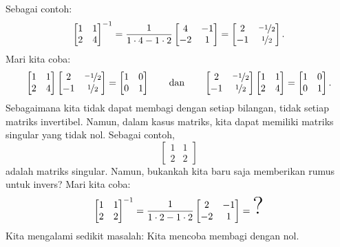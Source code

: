 Sebagai contoh:
\begin{equation*}
\begin{bmatrix}
1 & 1 \\
2 & 4
\end{bmatrix}^{-1}
=
\frac{1}{1\cdot 4-1 \cdot 2}
\begin{bmatrix}
4 & -1 \\
-2 & 1
\end{bmatrix}
=
\begin{bmatrix}
2 & \nicefrac{-1}{2} \\
-1 & \nicefrac{1}{2}
\end{bmatrix} .
\end{equation*}
Mari kita coba:
\begin{equation*}
\begin{bmatrix}
1 & 1 \\
2 & 4
\end{bmatrix}
\begin{bmatrix}
2 & \nicefrac{-1}{2} \\
-1 & \nicefrac{1}{2}
\end{bmatrix}
=
\begin{bmatrix}
1 & 0 \\
0 & 1
\end{bmatrix}
\qquad
\text{dan}
\qquad
\begin{bmatrix}
2 & \nicefrac{-1}{2} \\
-1 & \nicefrac{1}{2}
\end{bmatrix}
\begin{bmatrix}
1 & 1 \\
2 & 4
\end{bmatrix}
=
\begin{bmatrix}
1 & 0 \\
0 & 1
\end{bmatrix} .
\end{equation*}
Sebagaimana kita tidak dapat membagi dengan setiap bilangan, tidak setiap matriks
invertibel. Namun, dalam kasus matriks, kita dapat memiliki matriks
singular yang tidak nol. Sebagai contoh,
\begin{equation*}
\begin{bmatrix}
1 & 1 \\
2 & 2
\end{bmatrix}
\end{equation*}
adalah matriks singular. Namun, bukankah kita baru saja memberikan rumus untuk invers?
Mari kita coba:
\begin{equation*}
\begin{bmatrix}
1 & 1 \\
2 & 2
\end{bmatrix}^{-1}
=
\frac{1}{1\cdot 2-1 \cdot 2}
\begin{bmatrix}
2 & -1 \\
-2 & 1
\end{bmatrix}
=
\text{\Huge ?}
\end{equation*}
Kita mengalami sedikit masalah:
Kita mencoba membagi dengan nol.

